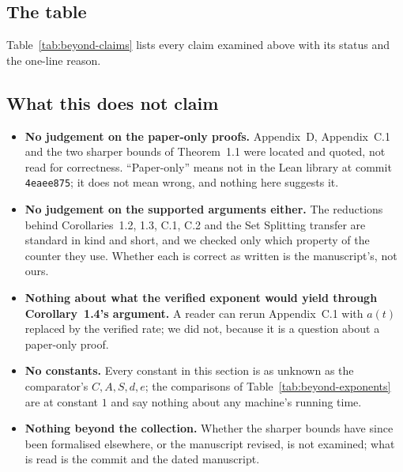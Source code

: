 \subsection{The table}

Table~\ref{tab:beyond-claims} lists every claim examined above with its
status and the one-line reason.
\begin{table}[htbp]
\caption{Every claim of the manuscript examined in this section: where
it is stated (page of \texttt{paper.pdf}, lines of the committed
extract), its status in the sense of Section~\ref{sec:beyond-statuses}
(verified, supported, or paper-only), and the one-line reason.
Generated, with every page and fragment checked against the extract and
the clone, by \texttt{python3 -I paper3/scripts/beyond\_claims.py}.}
\label{tab:beyond-claims}
\scriptsize

\end{table}

\subsection{What this does not claim}
\label{sec:beyond-not}

\begin{itemize}
\item \textbf{No judgement on the paper-only proofs.} Appendix~D,
  Appendix~C.1 and the two sharper bounds of Theorem~1.1 were located
  and quoted, not read for correctness. ``Paper-only'' means not in the
  Lean library at commit \texttt{4eaee875}; it does not mean wrong, and
  nothing here suggests it.
\item \textbf{No judgement on the supported arguments either.} The
  reductions behind Corollaries~1.2, 1.3, C.1, C.2 and the Set Splitting
  transfer are standard in kind and short, and we checked only which
  property of the counter they use. Whether each is correct as written
  is the manuscript's, not ours.
\item \textbf{Nothing about what the verified exponent would yield
  through Corollary~1.4's argument.} A reader can rerun Appendix~C.1
  with $a(t)$ replaced by the verified rate; we did not, because it is
  a question about a paper-only proof.
\item \textbf{No constants.} Every constant in this section is as
  unknown as the comparator's $C, A, S, d, e$; the comparisons of
  Table~\ref{tab:beyond-exponents} are at constant $1$ and say nothing
  about any machine's running time.
\item \textbf{Nothing beyond the collection.} Whether the sharper bounds
  have since been formalised elsewhere, or the manuscript revised, is
  not examined; what is read is the commit and the dated manuscript.
\end{itemize}
